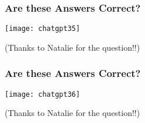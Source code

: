






\begin{frame}[fragile]\frametitle{Are these Answers Correct?}


\begin{center}
\texttt{[image: chatgpt35]}

\tiny{(Thanks to Natalie for the question!!)}

\end{center}


\end{frame}

\begin{frame}[fragile]\frametitle{Are these Answers Correct?}


\begin{center}
\texttt{[image: chatgpt36]}

\tiny{(Thanks to Natalie for the question!!)}

\end{center}


\end{frame}




